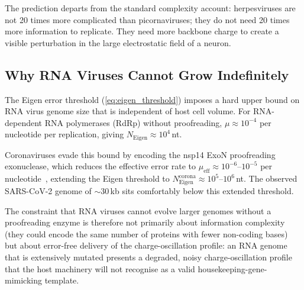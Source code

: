 \documentclass[11pt,twocolumn,a4paper]{article}
\theoremstyle{definition}
\theoremstyle{remark}
\begin{document}
The prediction departs from the standard complexity account: herpesviruses are not 20 times more complicated than picornaviruses; they do not need 20 times more information to replicate. They need more backbone charge to create a visible perturbation in the large electrostatic field of a neuron.

\subsection{Why RNA Viruses Cannot Grow Indefinitely}

The Eigen error threshold (\cref{eq:eigen_threshold}) imposes a hard upper bound on RNA virus genome size that is independent of host cell volume. For RNA-dependent RNA polymerases (RdRp) without proofreading, $\mu \approx 10^{-4}$ per nucleotide per replication, giving $N_{\mathrm{Eigen}} \approx 10^4$\,nt.

Coronaviruses evade this bound by encoding the nsp14 ExoN proofreading exonuclease, which reduces the effective error rate to $\mu_{\mathrm{eff}} \approx 10^{-6}$--$10^{-5}$ per nucleotide~\cite{Denison2011}, extending the Eigen threshold to $N_{\mathrm{Eigen}}^{\mathrm{corona}} \approx 10^5$--$10^6$\,nt. The observed SARS-CoV-2 genome of $\sim\!30$\,kb sits comfortably below this extended threshold.

The constraint that RNA viruses cannot evolve larger genomes without a proofreading enzyme is therefore not primarily about information complexity (they could encode the same number of proteins with fewer non-coding bases) but about error-free delivery of the charge-oscillation profile: an RNA genome that is extensively mutated presents a degraded, noisy charge-oscillation profile that the host machinery will not recognise as a valid housekeeping-gene-mimicking template.
\end{document}
